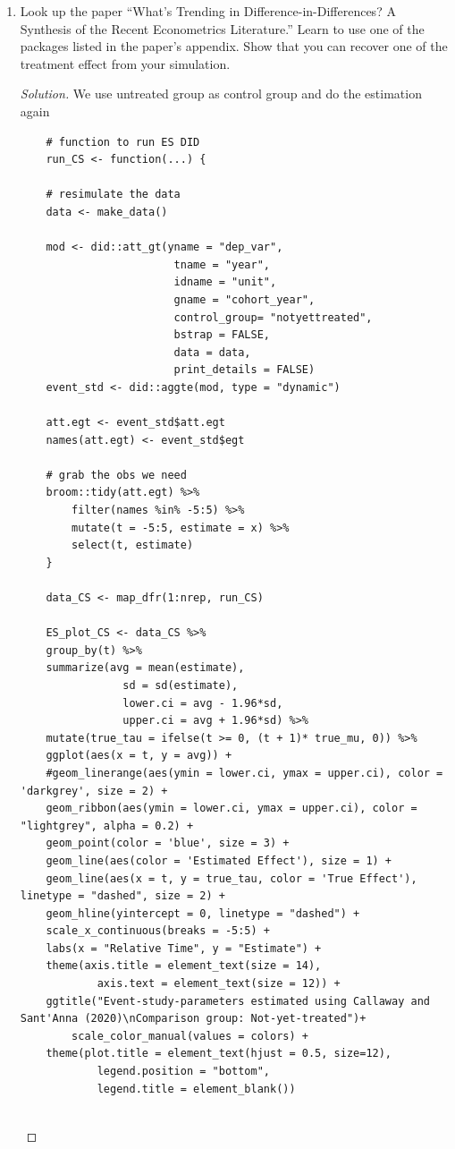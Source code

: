 \documentclass[11pt]{article}
\newenvironment{solution}{%
  \renewcommand\qedsymbol{$\blacksquare$}%
  \begin{mdframed}[backgroundcolor=gray!15]%
  \begin{proof}[Solution]}%
  {\end{proof}%
  \end{mdframed}}%
\begin{document}
\begin{enumerate}
\begin{solution}
            \end{solution}    

        \item Look up the paper ``What's Trending in Difference-in-Differences? A Synthesis of the Recent Econometrics Literature.'' Learn to use one of the packages listed in the paper's appendix. Show that you can recover one of the treatment effect from your simulation.
        
            \begin{solution}
                
                We use untreated group as control group and do the estimation again

                \begin{lstlisting}
    # function to run ES DID
    run_CS <- function(...) {

    # resimulate the data
    data <- make_data()

    mod <- did::att_gt(yname = "dep_var", 
                        tname = "year",
                        idname = "unit",
                        gname = "cohort_year",
                        control_group= "notyettreated",
                        bstrap = FALSE,
                        data = data,
                        print_details = FALSE)
    event_std <- did::aggte(mod, type = "dynamic")

    att.egt <- event_std$att.egt
    names(att.egt) <- event_std$egt

    # grab the obs we need
    broom::tidy(att.egt) %>% 
        filter(names %in% -5:5) %>% 
        mutate(t = -5:5, estimate = x) %>% 
        select(t, estimate)
    }

    data_CS <- map_dfr(1:nrep, run_CS)

    ES_plot_CS <- data_CS %>% 
    group_by(t) %>% 
    summarize(avg = mean(estimate),
                sd = sd(estimate),
                lower.ci = avg - 1.96*sd,
                upper.ci = avg + 1.96*sd) %>% 
    mutate(true_tau = ifelse(t >= 0, (t + 1)* true_mu, 0)) %>% 
    ggplot(aes(x = t, y = avg)) + 
    #geom_linerange(aes(ymin = lower.ci, ymax = upper.ci), color = 'darkgrey', size = 2) + 
    geom_ribbon(aes(ymin = lower.ci, ymax = upper.ci), color = "lightgrey", alpha = 0.2) +
    geom_point(color = 'blue', size = 3) + 
    geom_line(aes(color = 'Estimated Effect'), size = 1) + 
    geom_line(aes(x = t, y = true_tau, color = 'True Effect'), linetype = "dashed", size = 2) + 
    geom_hline(yintercept = 0, linetype = "dashed") + 
    scale_x_continuous(breaks = -5:5) + 
    labs(x = "Relative Time", y = "Estimate") + 
    theme(axis.title = element_text(size = 14),
            axis.text = element_text(size = 12)) +
    ggtitle("Event-study-parameters estimated using Callaway and Sant'Anna (2020)\nComparison group: Not-yet-treated")+
        scale_color_manual(values = colors) + 
    theme(plot.title = element_text(hjust = 0.5, size=12),
            legend.position = "bottom", 
            legend.title = element_blank())


\end{lstlisting}
\end{solution}
\end{enumerate}
\end{document}
